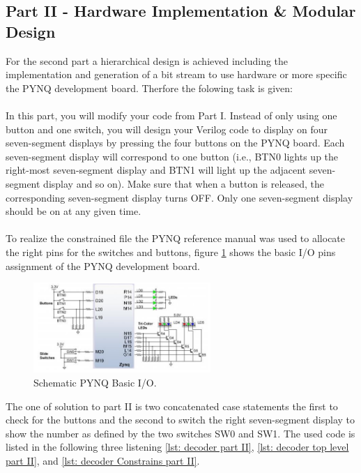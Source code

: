 \subsection{Part II - Hardware Implementation \& Modular Design}\label{sub: Hardware Implementation Modular Design}
For the second part a hierarchical design is achieved including the implementation and generation of a bit stream to use hardware or more specific the PYNQ development board. Therfore the folowing task is given:
\\
\\
In this part, you will modify your code from Part I. Instead of only using one button and one switch, you will
design your Verilog code to display on four seven-segment displays by pressing the four buttons on the PYNQ
board. Each seven-segment display will correspond to one button (i.e., BTN0 lights up the right-most seven-segment
display and BTN1 will light up the adjacent seven-segment display and so on). Make sure that when a
button is released, the corresponding seven-segment display turns OFF. Only one seven-segment display should
be on at any given time.
\\
\\
To realize the constrained file the PYNQ reference manual was used to allocate the right pins for the switches and buttons, figure \ref{fig: PYNQ_BasicIO} shows the basic I/O pins assignment of the PYNQ development board.
\begin{figure}[H]
	\centering
	\includegraphics[width=0.6\textwidth]{01_images/PYNQ_BasicIO.png}
	\caption{Schematic PYNQ Basic I/O. \cite{PYNG_RM}}
	\label{fig: PYNQ_BasicIO}
\end{figure}
The one of solution to part II is two concatenated case statements the first to check for the buttons and the second to switch the right seven-segment display to show the number as defined by the two switches SW0 and SW1. The used code is listed in the following three listening \ref{lst: decoder part II}, \ref{lst: decoder top level part II}, and \ref{lst: decoder Constrains part II}.
%

